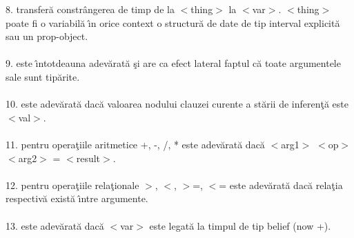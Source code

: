 \documentclass{article}
\begin{document}
{8.\hspace{10}{\tt(time-of <thing> <var>)} transfer\u{a} constr\^{a}ngerea de timp de la
$<$thing$>$ la $<$var$>$. $<$thing$>$ poate fi o variabil\u{a} \^{\i}n orice context
o structur\u{a} de date de tip interval explicit\u{a} sau un prop-object.
\\ \\
9.\hspace{10}{\tt(print <anything> <anything> ...)} este \^{\i}ntotdeauna adev\u{a}rat\u{a}
\c{s}i are ca efect lateral faptul c\u{a} toate argumentele sale sunt tip\u{a}rite.
\\ \\
10.\hspace{6}{\tt(current-clause-value <state> <val>)} este adev\u{a}rat\u{a} dac\u{a}
valoarea nodului clauzei curente a st\u{a}rii de inferen\c{t}\u{a} este $<$val$>$.
\\ \\
11.\hspace{6}{\tt(<op> <arg1> <arg2> <result>)} pentru opera\c{t}iile aritmetice +, -, /, *
este adev\u{a}rat\u{a} dac\u{a} $<$arg1$>$ $<$op$>$ $<$arg2$>$ = $<$result$>$.
\\ \\
12.\hspace{6}{\tt(<rel-op> <arg1> <arg2>)} pentru opera\c{t}iile rela\c{t}ionale $>$, $<$,
$>$=, $<$= este adev\u{a}rat\u{a} dac\u{a} rela\c{t}ia respectiv\u{a} exist\u{a} \^{\i}ntre
argumente.
\\ \\
13.\hspace{6}{\tt(belief-now <var>)} este adev\u{a}rat\u{a} dac\u{a} $<$var$>$ este legat\u{a}
la timpul de tip belief \linebreak (now +).
}

\newpage
\appendix
\end{document}
